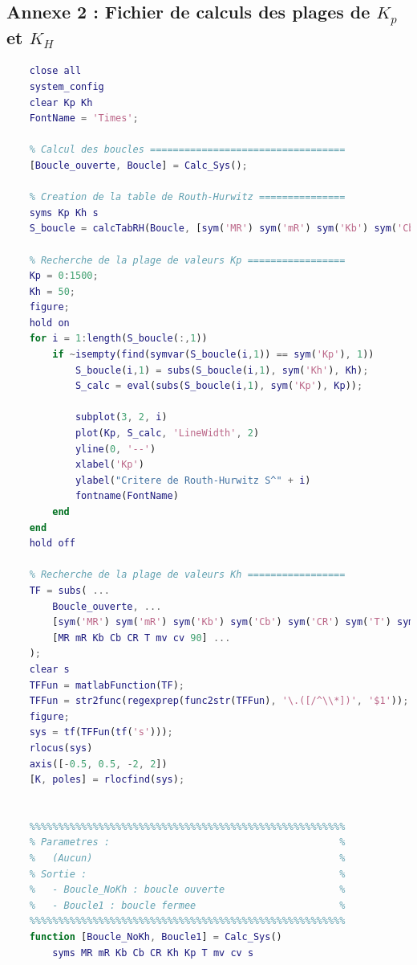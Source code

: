 \documentclass[a4paper,12pt]{article}
\begin{document}
    \subsection{Annexe 2 : Fichier de calculs des plages de $K_p$ et $K_H$} \label{Annexe:calcRHFile}
    \begin{lstlisting}[caption={Fichier de calculs des plages de $K_p$ et $K_H$}, language=Matlab]
    % Initialisation ======================================
    close all
    system_config
    clear Kp Kh
    FontName = 'Times';

    % Calcul des boucles ==================================
    [Boucle_ouverte, Boucle] = Calc_Sys();

    % Creation de la table de Routh-Hurwitz ===============
    syms Kp Kh s
    S_boucle = calcTabRH(Boucle, [sym('MR') sym('mR') sym('Kb') sym('Cb') sym('CR') sym('T') sym('mv') sym('cv')], [MR mR Kb Cb CR T mv cv], s);

    % Recherche de la plage de valeurs Kp =================
    Kp = 0:1500;
    Kh = 50;
    figure;
    hold on
    for i = 1:length(S_boucle(:,1))
        if ~isempty(find(symvar(S_boucle(i,1)) == sym('Kp'), 1))
            S_boucle(i,1) = subs(S_boucle(i,1), sym('Kh'), Kh);
            S_calc = eval(subs(S_boucle(i,1), sym('Kp'), Kp));
    
            subplot(3, 2, i)
            plot(Kp, S_calc, 'LineWidth', 2)
            yline(0, '--')
            xlabel('Kp')
            ylabel("Critere de Routh-Hurwitz S^" + i)
            fontname(FontName)
        end
    end
    hold off
    
    % Recherche de la plage de valeurs Kh =================
    TF = subs( ...
        Boucle_ouverte, ...
        [sym('MR') sym('mR') sym('Kb') sym('Cb') sym('CR') sym('T') sym('mv') sym('cv') sym('Kp')], ...
        [MR mR Kb Cb CR T mv cv 90] ...
    );
    clear s
    TFFun = matlabFunction(TF);
    TFFun = str2func(regexprep(func2str(TFFun), '\.([/^\\*])', '$1'));
    figure;
    sys = tf(TFFun(tf('s')));
    rlocus(sys)
    axis([-0.5, 0.5, -2, 2])
    [K, poles] = rlocfind(sys);
    

    %%%%%%%%%%%%%%%%%%%%%%%%%%%%%%%%%%%%%%%%%%%%%%%%%%%%%%%
    % Parametres :                                        %
    %   (Aucun)                                           %
    % Sortie :                                            %
    %   - Boucle_NoKh : boucle ouverte                    %
    %   - Boucle1 : boucle fermee                         %
    %%%%%%%%%%%%%%%%%%%%%%%%%%%%%%%%%%%%%%%%%%%%%%%%%%%%%%%
    function [Boucle_NoKh, Boucle1] = Calc_Sys()
        syms MR mR Kb Cb CR Kh Kp T mv cv s


\end{lstlisting}
\end{document}
